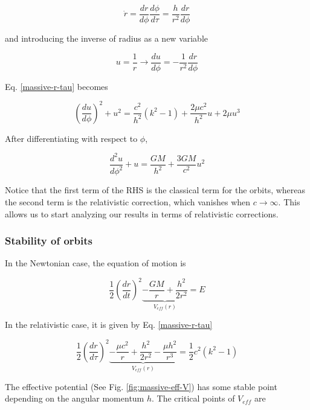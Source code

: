 \documentclass[letterpaper,11pt,onecolumn]{article}
\begin{document}
\begin{equation*}
    \dot{r} = \frac{dr}{d\phi} \frac{d\phi}{d\tau} = \frac{h}{r^2} \frac{dr}{d\phi} 
\end{equation*}

and introducing the inverse of radius as a new variable 

\begin{equation*}
    u = \frac{1}{r} \longrightarrow \frac{du}{d\phi} = - \frac{1}{r^2} \frac{dr}{d\phi}
\end{equation*}

Eq. \ref{massive-r-tau} becomes

\begin{equation}
    \left( \frac{du}{d\phi} \right)^2 + u^2 = \frac{c^2}{h^2} (k^2 - 1) + \frac{2\mu c^2}{h^2} u + 2 \mu u^3
\end{equation}

After differentiating with respect to $\phi$, 

\begin{equation} \label{massive-u-eq}
    \frac{d^2u}{d \phi^2} + u = \frac{GM}{h^2} + \frac{3GM}{c^2} u^2
\end{equation}

Notice that the first term of the RHS is the classical term for the orbits, whereas the second term is the relativistic correction, which vanishes when $c\to\infty$. This allows us to start analyzing our results in terms of relativistic corrections. 

\subsubsection{Stability of orbits}

In the Newtonian case, the equation of motion is 

\begin{equation} \label{massive-traj-newton}
    \frac12 \left( \frac{dr}{dt} \right)^2  \underbrace{-\frac{GM}{r} + \frac{h^2}{2r^2}}_{V_{eff}(r)} = E
\end{equation}

In the relativistic case, it is given by Eq. \ref{massive-r-tau}

\begin{equation} \label{massive-traj-rela}
    \frac12 \left( \frac{dr}{d\tau} \right)^2  \underbrace{-\frac{\mu c^2}{r} + \frac{h^2}{2r^2} - \frac{\mu h^2}{r^3}}_{V_{eff}(r)} = \frac12 c^2 (k^2-1)
\end{equation}

The effective potential (See Fig. \ref{fig:massive-eff-V}) has some stable point depending on the angular momentum $h$. The critical points of $V_{eff}$ are 
\end{document}
